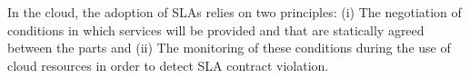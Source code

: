 



In the cloud, the adoption of SLAs relies on two principles: (i) The negotiation of conditions in which services will be provided and that are statically agreed between the parts and (ii) The monitoring of these conditions during the use of cloud resources in order to detect SLA contract violation.

